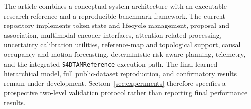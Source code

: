 The article combines a conceptual system architecture with an executable research reference and a reproducible benchmark framework. The current repository implements token state and lifecycle management, proposal and association, multimodal encoder interfaces, attention-related processing, uncertainty calibration utilities, reference-map and topological support, causal occupancy and motion forecasting, deterministic risk-aware planning, telemetry, and the integrated \texttt{S4DTAMReference} execution path. The final learned hierarchical model, full public-dataset reproduction, and confirmatory results remain under development. Section~\ref{sec:experiments} therefore specifies a prospective two-level validation protocol rather than reporting final performance results.
